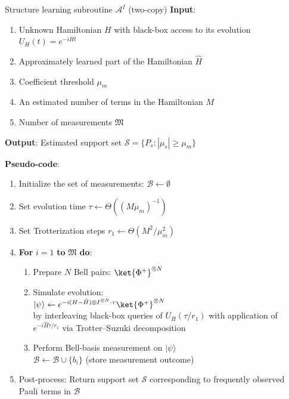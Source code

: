 \documentclass[twocolumn,superscriptaddress,aps,showpacs,amsmath,amstex,amssymb,citeautoscript,floatfix,pra,preprintnumbers]{revtex4-2}
\newcounter{alg}
\theoremstyle{plain}
\theoremstyle{plain}
\theoremstyle{plain}
\theoremstyle{plain}
\theoremstyle{plain}
\theoremstyle{plain}
\begin{document}
\begin{alg}[htbp]{Structure learning subroutine $\mathcal{A}^{I}$ (two-copy)}
\label{alg:algorithm_I}
\textbf{Input}: \vspace{-2mm}
\begin{enumerate}
    \item Unknown Hamiltonian $H$ with black-box access to its evolution $U_{H}(t)=e^{-iHt}$\vspace{-2mm}
    \item Approximately learned part of the Hamiltonian $\hat{H}$\vspace{-2mm}
    \item Coefficient threshold $\mu_m$\vspace{-2mm}
    \item An estimated number of terms in the Hamiltonian $M$\vspace{-2mm}
    \item Number of measurements $\mathfrak{M}$
\end{enumerate}\vspace{-2mm}

\textbf{Output}: Estimated support set $\mathcal{S} = \{ P_s : |\mu_s| \geq \mu_m\}$\vspace{2mm}

\textbf{Pseudo-code}:\vspace{-2mm}
\begin{enumerate}
    \item Initialize the set of measurements: $\mathcal{B} \gets \emptyset$\vspace{-2mm}
    \item Set evolution time $\tau \gets \Theta((M\mu_m)^{-1})$\vspace{-2mm}
    \item Set Trotterization steps $r_1 \gets \Theta(M^2/\mu_m^2)$ \vspace{-2mm}
    \item \textbf{For} $i = 1$ \textbf{to} $\mathfrak{M}$ \textbf{do}:\vspace{-2mm}
    \begin{enumerate}
        \item Prepare $N$ Bell pairs: $\ket{\Phi^+}^{\otimes N}$ \vspace{-0mm}
        \item Simulate evolution: \\
        $|\psi\rangle \gets e^{-i(H-\hat{H})\otimes I^{\otimes N} \cdot \tau} \ket{\Phi^+}^{\otimes N}$\\
        by interleaving black-box queries of $U_H(\tau/r_1)$ with application of $e^{-i\hat{H}\tau/r_1}$ via Trotter–Suzuki decomposition
        \item Perform Bell-basis measurement on $|\psi\rangle$\\
        $\mathcal{B} \gets \mathcal{B} \cup \{b_i\}$ \quad (store measurement outcome)
    \end{enumerate}
    \vspace{-3mm}
    \item Post-process: Return support set $\mathcal{S}$ corresponding to frequently observed Pauli terms in $\mathcal{B}$
\end{enumerate}
\end{alg}
\end{document}
